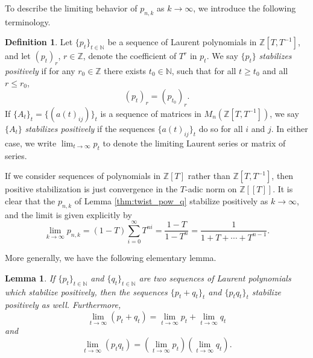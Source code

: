 \documentclass[11pt,hyp,]{nyjm}
\newcommand{\Z}{\mathbb{Z}}
\newcommand{\N}{\mathbb{N}}
\numberwithin{thm}{section}
\newtheorem{lemma}[thm]{Lemma}
\theoremstyle{definition}
\newtheorem{defn}[thm]{Definition}
\theoremstyle{remark}
\begin{document}
	To describe the limiting behavior of $p_{n,k}$ as $k \to \infty$, we introduce the following terminology.
	
	\begin{defn}
		\label{def:stab}
		Let $\{p_t\}_{t \in \N}$ be a sequence of Laurent polynomials in $\Z[T,T^{-1}]$, and let $(p_t)_r$, $r \in \Z$, denote the coefficient of $T^r$ in $p_t$. We say $\{p_t\}$ {\em stabilizes positively} if for any $r_0 \in \Z$ there exists $t_0 \in \N$, such that for all $t \geq t_0$ and all $r \leq r_0$,
		$$
		(p_t)_r = (p_{t_0})_r.
		$$
		If $\{A_t\}_t = \{(a(t)_{ij})\}_t$ is a sequence of matrices in $M_n(\Z[T,T^{-1}])$, we say $\{A_t\}$ {\em stabilizes positively} if the sequences $\{a(t)_{ij}\}_t$ do so for all $i$ and $j$. In either case, we write $\lim_{t \to \infty} p_t$ to denote the limiting Laurent series or matrix of series.
	\end{defn}

	If we consider sequences of polynomials in $\Z[T]$ rather than $\Z[T,T^{-1}]$, then positive stabilization is just convergence in the $T$-adic norm on $\Z[[T]]$. It is clear that the $p_{n,k}$ of Lemma \ref{thm:twist_pow_q} stabilize positively as $k \to \infty$, and the limit is given explicitly by
	\begin{equation}
		\label{eq:limit_poly}
		\lim_{k \to \infty} p_{n,k} = (1 - T)\sum_{i = 0}^\infty T^{ni} = \frac{1 - T}{1 - T^n} = \frac{1}{1 + T + \cdots + T^{n - 1}}.
	\end{equation}

	More generally, we have the following elementary lemma.
	
	\begin{lemma}
		\label{lem:stab_cont}
		If $\{p_t\}_{t \in \N}$ and $\{q_t\}_{t \in \N}$ are two sequences of Laurent polynomials which stabilize positively, then the sequences $\{p_t + q_t\}_t$ and $\{p_tq_t\}_t$ stabilize positively as well. Furthermore,
		$$
		\lim_{t \to \infty} (p_t + q_t) = \lim_{t \to \infty} p_t + \lim_{t \to \infty} q_t
		$$
		and
		$$
		\lim_{t \to \infty} (p_tq_t) = (\lim_{t \to \infty} p_t)(\lim_{t \to \infty} q_t).
		$$
	\end{lemma}
	
\end{document}
